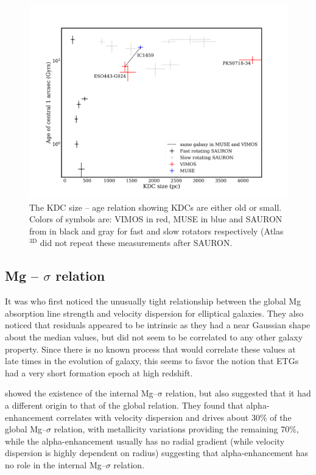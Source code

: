 		\begin{figure}
			\centering
			\includegraphics[width=.8\textwidth]{chapter4/KDC_size_age.png}
			\caption[KDC dichotomy]{The KDC size -- age relation showing KDCs are either old or small. Colors of symbols are: VIMOS in red, MUSE in blue and SAURON from \citet{Kuntschner2010} in black and gray for fast and slow rotators respectively (Atlas$^\text{3D}$ did not repeat these measurements after SAURON.}
			\label{fig:KDC}
		\end{figure}


	\subsection{Mg -- $\sigma$ relation}
		\label{subsec:Mgsigma}

		It was \citet{Bender1993} who first noticed the unusually tight relationship between the global Mg absorption line strength and velocity dispersion for elliptical galaxies. They also noticed that residuals appeared to be intrinsic as they had a near Gaussian shape about the median values, but did not seem to be correlated to any other galaxy property. Since there is no known process that would correlate these values at late times in the evolution of galaxy, this seems to favor the notion that ETGs had a very short formation epoch at high redshift. 

		\citet{Mehlert2003} showed the existence of the internal Mg--$\mathrm{\sigma}$ relation, but also suggested that it had a different origin to that of the global relation. They found that alpha-enhancement correlates with velocity dispersion and drives about 30\% of the global Mg--$\sigma$ relation, with metallicity variations providing the remaining 70\%, while the alpha-enhancement usually has no radial gradient (while velocity dispersion is highly dependent on radius) suggesting that alpha-enhancement has no role in the internal Mg--$\sigma$ relation. 

